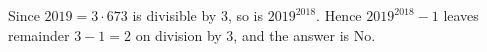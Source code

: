 Since $2019=3\cdot673$ is divisible by $3$, so is $2019^{2018}$. Hence $2019^{2018}-1$ leaves remainder $3-1=2$ on division by $3$, and the answer is $\boxed{\text{No}}$.
